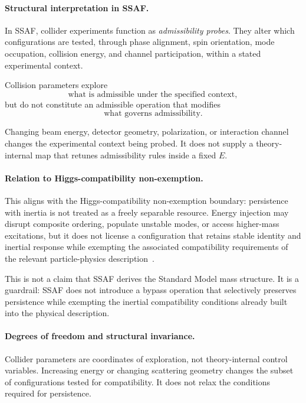 \documentclass[aps,prx,onecolumn,11pt]{revtex4-2}
\theoremstyle{plain}
\theoremstyle{definition}
\theoremstyle{remark}
\begin{document}
\paragraph{Structural interpretation in SSAF.}

In SSAF, collider experiments function as \emph{admissibility probes}.
They alter which configurations are tested, through phase alignment,
spin orientation, mode occupation, collision energy, and channel
participation, within a stated experimental context.

Collision parameters explore
\[
\text{what is admissible under the specified context},
\]
but do not constitute an admissible operation that modifies
\[
\text{what governs admissibility}.
\]

Changing beam energy, detector geometry, polarization, or interaction
channel changes the experimental context being probed. It does not
supply a theory-internal map that retunes admissibility rules inside a
fixed \(E\).

\paragraph{Relation to Higgs-compatibility non-exemption.}

This aligns with the Higgs-compatibility non-exemption boundary:
persistence with inertia is not treated as a freely separable resource.
Energy injection may disrupt composite ordering, populate unstable
modes, or access higher-mass excitations, but it does not license a
configuration that retains stable identity and inertial response while
exempting the associated compatibility requirements of the relevant
particle-physics description~\cite{Higgs1964,Englert1964}.

This is not a claim that SSAF derives the Standard Model mass structure.
It is a guardrail: SSAF does not introduce a bypass operation that
selectively preserves persistence while exempting the inertial
compatibility conditions already built into the physical description.

\paragraph{Degrees of freedom and structural invariance.}

Collider parameters are coordinates of exploration, not
theory-internal control variables. Increasing energy or changing
scattering geometry changes the subset of configurations tested for
compatibility. It does not relax the conditions required for
persistence.
\end{document}
